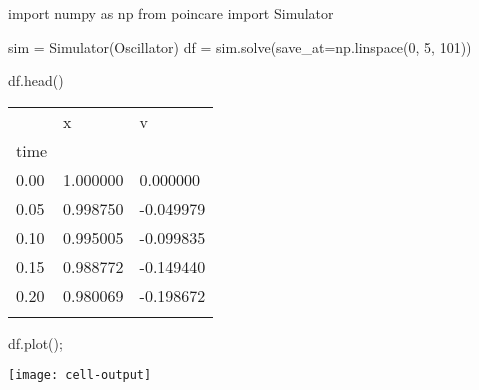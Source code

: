 \documentclass[namedate,numsec,webpdf,modern,large]{oup-authoring-template}
\theoremstyle{thmstyleone}%
\theoremstyle{thmstyletwo}%
\theoremstyle{thmstylethree}%
\newenvironment{CodeInput}{\begin{tcolorbox}[title=input,boxrule=0pt]}{\end{tcolorbox}}
\newenvironment{CodeOutput}{\begin{tcolorbox}[title=output,boxrule=0pt]}{\end{tcolorbox}}
\newcommand{\KeywordTok}[1]{\textcolor[rgb]{0.00,0.13,1.00}{#1}}
\newcommand{\ClassTok}[1]{\textcolor[rgb]{0.27,0.56,0.65}{#1}}
\newcommand{\OperatorTok}[1]{\textcolor[rgb]{0.00,0.00,0.00}{#1}}
\newcommand{\VariableTok}[1]{\textcolor[rgb]{0.00,0.06,0.50}{#1}}
\newcommand{\ValueTok}[1]{\textcolor[rgb]{0.13,0.57,0.41}{#1}}
\newcommand{\FunctionTok}[1]{\textcolor[rgb]{0.47,0.37,0.15}{#1}}
\begin{document}
\begin{figure*}[t]
  \begin{minipage}[t]{\linewidth}
    \begin{CodeInput}
    \begin{Highlighting}[]
    \KeywordTok{import} \ClassTok{numpy} \KeywordTok{as} \ClassTok{np}
    \KeywordTok{from} \ClassTok{poincare} \KeywordTok{import} \ClassTok{Simulator}
    
    \VariableTok{sim} \OperatorTok{=} \ClassTok{Simulator}\KeywordTok{(\ClassTok{Oscillator})}
    \VariableTok{df} \OperatorTok{=} \VariableTok{sim}.\FunctionTok{solve}\KeywordTok{(}\VariableTok{save\_at}\OperatorTok{=}\ClassTok{np}.\FunctionTok{linspace}\KeywordTok{(}\ValueTok{0}, \ValueTok{5}, \ValueTok{101}\KeywordTok{))}
    \end{Highlighting}
    \end{CodeInput}
  \end{minipage}%
  \newline
  \begin{minipage}[t]{0.45\linewidth}
    \begin{CodeInput}
    \begin{Highlighting}[]
    \VariableTok{df}.\FunctionTok{head}\KeywordTok{()}
    \end{Highlighting}
    \end{CodeInput}
    \begin{CodeOutput}
        \begin{tabular}[]{@{}lll@{}}
            \toprule
            & x & v \\
            time & & \\
            \midrule
            0.00 & 1.000000 & 0.000000 \\
            0.05 & 0.998750 & -0.049979 \\
            0.10 & 0.995005 & -0.099835 \\
            0.15 & 0.988772 & -0.149440 \\
            0.20 & 0.980069 & -0.198672 \\
            \botrule
        \end{tabular}
    \end{CodeOutput}
  \end{minipage}%
  \hfill
  \begin{minipage}[t]{0.45\linewidth}
    \begin{CodeInput}
    \begin{Highlighting}[]
    \VariableTok{df}.\FunctionTok{plot}\KeywordTok{()}\OperatorTok{;}
    \end{Highlighting}
    \end{CodeInput}
    \begin{CodeOutput}
      \texttt{[image: cell-output]}
    \end{CodeOutput}
  \end{minipage}%
  

\end{figure*}
\end{document}

